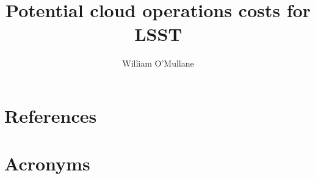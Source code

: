 \documentclass[DM,authoryear,toc]{lsstdoc}
\title{Potential cloud operations costs for LSST}
\author{%
William O'Mullane
}
\date{\vcsDate}
\begin{document}
\maketitle


\appendix
\section{References} \label{sec:bib}


\section{Acronyms} \label{sec:acronyms}

\end{document}
